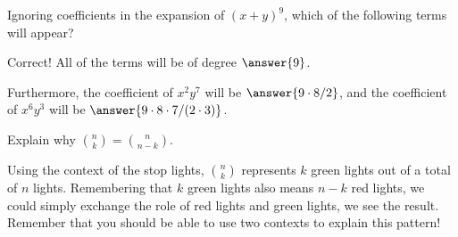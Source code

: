 \documentclass[nooutcomes]{ximera}
\begin{document}
\begin{problem}
Ignoring coefficients in the expansion of $(x+y)^9$, which of the following terms will appear?
\begin{selectAll}
\end{selectAll}
\begin{problem}
Correct!  All of the terms will be of degree $\answer{9}$.  

Furthermore, the coefficient of $x^2y^7$ will be $\answer{9\cdot 8/2}$, 
and the coefficient of $x^6y^3$ will be $\answer{9\cdot 8\cdot 7/(2\cdot3)}$.
\end{problem}
\end{problem}

\begin{problem}
Explain why ${n \choose k} = {n \choose n-k}$.
\begin{freeResponse}
	\begin{hint}
		Using the context of the stop lights, ${n \choose k}$ represents $k$ green lights out of a total of $n$ lights.  Remembering that $k$ green lights also means $n-k$ red lights, we could simply exchange the role of red lights and green lights, we see the result.  Remember that you should be able to use two contexts to explain this pattern!
	\end{hint}
\end{freeResponse}
\end{problem}



\end{document}
